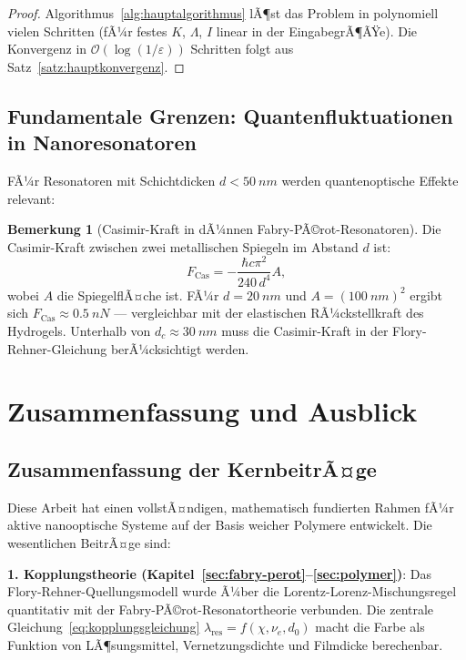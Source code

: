 ﻿\documentclass[a4paper,12pt]{article}
\theoremstyle{definition}
\newtheorem{bemerkung}{Bemerkung}[section]
\newcommand{\ordre}[1]{\mathcal{O}\!\left(#1\right)}
\begin{document}
	\begin{proof}
		Algorithmus~\ref{alg:hauptalgorithmus} lÃ¶st das Problem in polynomiell
		vielen Schritten (fÃ¼r festes $K$, $\Lambda$, $I$ linear in der EingabegrÃ¶ÃŸe).
		Die Konvergenz in $\ordre{\log(1/\varepsilon)}$ Schritten folgt aus
		Satz~\ref{satz:hauptkonvergenz}.
	\end{proof}
	
	\subsection{Fundamentale Grenzen: Quantenfluktuationen in Nanoresonatoren}
	
	FÃ¼r Resonatoren mit Schichtdicken $d < \SI{50}{nm}$ werden
	quantenoptische Effekte relevant:
	
	\begin{bemerkung}[Casimir-Kraft in dÃ¼nnen Fabry-PÃ©rot-Resonatoren]
		Die Casimir-Kraft zwischen zwei metallischen Spiegeln im Abstand $d$ ist:
		\begin{equation}
			F_\mathrm{Cas} = -\frac{\hbar c \pi^2}{240\, d^4} A,
			\label{eq:casimir}
		\end{equation}
		wobei $A$ die SpiegelflÃ¤che ist. FÃ¼r $d = \SI{20}{nm}$ und
		$A = (\SI{100}{nm})^2$ ergibt sich $F_\mathrm{Cas} \approx \SI{0.5}{nN}$ ---
		vergleichbar mit der elastischen RÃ¼ckstellkraft des Hydrogels.
		Unterhalb von $d_c \approx \SI{30}{nm}$ muss die Casimir-Kraft in der
		Flory-Rehner-Gleichung berÃ¼cksichtigt werden.
	\end{bemerkung}
	
	\section{Zusammenfassung und Ausblick}
	\label{sec:zusammenfassung}
	
	\subsection{Zusammenfassung der KernbeitrÃ¤ge}
	
	Diese Arbeit hat einen vollstÃ¤ndigen, mathematisch fundierten Rahmen fÃ¼r
	aktive nanooptische Systeme auf der Basis weicher Polymere entwickelt.
	Die wesentlichen BeitrÃ¤ge sind:
	
	\textbf{1. Kopplungstheorie (Kapitel~\ref{sec:fabry-perot}--\ref{sec:polymer})}:
	Das Flory-Rehner-Quellungsmodell wurde Ã¼ber die Lorentz-Lorenz-Mischungsregel
	quantitativ mit der Fabry-PÃ©rot-Resonatortheorie verbunden. Die zentrale
	Gleichung~\eqref{eq:kopplungsgleichung} $\lambda_\mathrm{res} = f(\chi, \nu_e, d_0)$
	macht die Farbe als Funktion von LÃ¶sungsmittel, Vernetzungsdichte und
	Filmdicke berechenbar.
	
\end{document}
